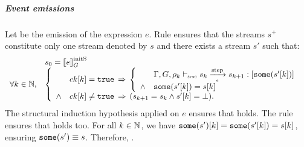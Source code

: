\begin{skippableproof}
    \subparagraph{Event emissions}
    Let  be the emission of the expression $e$.
    Rule  ensures that the streams
    $s^+$ constitute only one stream denoted by $s$ and there exists a stream $s'$ such that:
    \begin{equation*}
        \begin{array}{ll}
                              & s_0 = \initstate{e} \\
            \forall k \in \N, &
            \left\{
            \begin{array}{ll}
                       & ck[k] = \true \, \Rightarrow \,
                \left\{
                \begin{array}{ll}
                           & \exprOpsem{\rho_k}{s_k}{e}{s_{k+1}}{\some{s'[k]}} \\
                    \wedge & \some{s'[k]} = s[k]                               \\
                \end{array}
                \right.                                                                           \\
                \wedge & ck[k] \neq \true \, \Rightarrow \,  (s_{k+1} = s_k \wedge s'[k] = \bot). \\
            \end{array}
            \right.
        \end{array}
    \end{equation*}
    The structural induction hypothesis applied on $e$ ensures that 
    holds. The rule  ensures that 
    {}{} holds too. For all $k \in \mathbb{N}$, we have $\mathtt{{some}}(s')[k] =
        \mathtt{{some}}(s'[k]) = s[k]$, ensuring $\mathtt{{some}}(s') \equiv s$. Therefore, .


\end{skippableproof}
